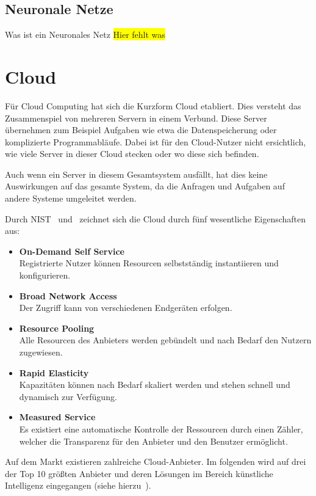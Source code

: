 \subsection{Neuronale Netze}
Was ist ein Neuronales Netz
\colorbox{yellow}{Hier fehlt was}

\section{Cloud}
Für Cloud Computing hat sich die Kurzform Cloud etabliert. Dies versteht das Zusammenspiel von mehreren Servern in einem
Verbund. Diese Server übernehmen zum Beispiel Aufgaben wie etwa die Datenspeicherung oder komplizierte Programmabläufe.
Dabei ist für den Cloud-Nutzer nicht ersichtlich, wie viele Server in dieser Cloud stecken oder wo diese sich befinden.

Auch wenn ein Server in diesem Gesamtsystem ausfällt, hat dies keine Auswirkungen auf das gesamte System, da die Anfragen
und Aufgaben auf andere Systeme umgeleitet werden.

Durch NIST~\cite{online_grundlagen_cloud_nist} und~\cite{online_grundlagen_cloud_computing} zeichnet sich die Cloud durch
fünf wesentliche Eigenschaften aus:

\begin{itemize}
    \item \textbf{On-Demand Self Service} \\
    Registrierte Nutzer können Resourcen selbstständig instantiieren und konfigurieren.
    \item \textbf{Broad Network Access} \\
    Der Zugriff kann von verschiedenen Endgeräten erfolgen.
    \item \textbf{Resource Pooling} \\
    Alle Resourcen des Anbieters werden gebündelt und nach Bedarf den Nutzern zugewiesen.
    \item \textbf{Rapid Elasticity} \\
    Kapazitäten können nach Bedarf skaliert werden und stehen schnell und dynamisch zur Verfügung.
    \item \textbf{Measured Service} \\
    Es existiert eine automatische Kontrolle der Ressourcen durch einen Zähler, welcher die Transparenz für den
    Anbieter und den Benutzer ermöglicht.
\end{itemize}

Auf dem Markt existieren zahlreiche Cloud-Anbieter. Im folgenden wird auf drei der Top 10 größten Anbieter und deren
Lösungen im Bereich künstliche Intelligenz eingegangen (siehe hierzu~\cite{online_grundlagen_cloud}).

